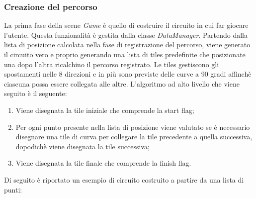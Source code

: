 \documentclass[documentation.tex]{subfiles}
\begin{document}
	\subsubsection{Creazione del percorso}
	La prima fase della scene \textit{Game} è quello di costruire il circuito in cui far giocare l'utente. Questa funzionalità è gestita dalla classe \textit{DataManager}. Partendo dalla lista di posizione calcolata nella fase di registrazione del percorso, viene generato il circuito vero e proprio generando una lista di tiles predefinite che posizionate una dopo l'altra ricalchino il percorso registrato. Le tiles gestiscono gli spostamenti nelle 8 direzioni e in più sono previste delle curve a 90 gradi affinchè ciascuna possa essere collegata alle altre. L'algoritmo ad alto livello che viene seguito è il seguente:
	\begin{enumerate}
		\item Viene disegnata la tile iniziale che comprende la start flag;
		\item Per ogni punto presente nella lista di posizione viene valutato se è necessario disegnare una tile di curva per collegare la tile precedente a quella successiva, dopodichè viene disegnata la tile successiva;
		\item Viene disegnata la tile finale che comprende la finish flag.
	\end{enumerate}
	Di seguito è riportato un esempio di circuito costruito a partire da una lista di punti:
	\begin{figure}[h]
	\end{figure}
\end{document}
